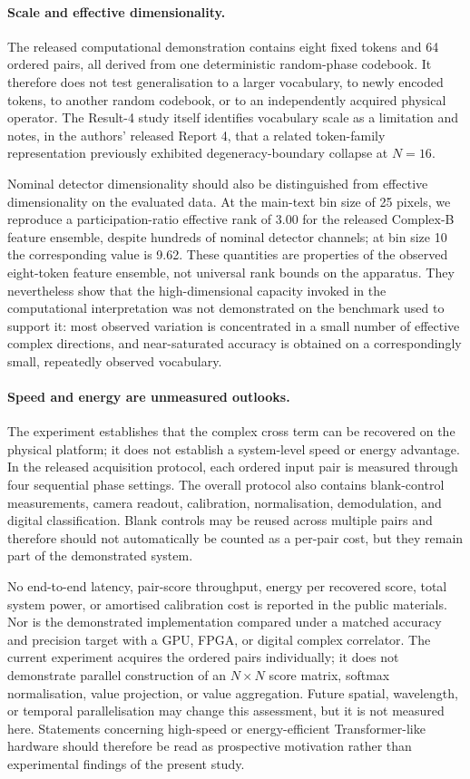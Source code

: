 \documentclass[11pt,a4paper]{article}
\begin{document}
\paragraph{Scale and effective dimensionality.}
The released computational demonstration contains eight fixed tokens and
64 ordered pairs, all derived from one deterministic random-phase codebook.
It therefore does not test generalisation to a larger vocabulary, to newly
encoded tokens, to another random codebook, or to an independently acquired
physical operator. The Result-4 study itself identifies vocabulary scale as a
limitation and notes, in the authors' released Report 4, that a related
token-family representation previously exhibited degeneracy-boundary collapse
at $N=16$.

Nominal detector dimensionality should also be distinguished from effective
dimensionality on the evaluated data. At the main-text bin size of 25 pixels,
we reproduce a participation-ratio effective rank of 3.00 for the released
Complex-B feature ensemble, despite hundreds of nominal detector channels;
at bin size 10 the corresponding value is 9.62. These quantities are
properties of the observed eight-token feature ensemble, not universal rank
bounds on the apparatus. They nevertheless show that the high-dimensional
capacity invoked in the computational interpretation was not demonstrated on
the benchmark used to support it: most observed variation is concentrated in
a small number of effective complex directions, and near-saturated accuracy
is obtained on a correspondingly small, repeatedly observed vocabulary.

\paragraph{Speed and energy are unmeasured outlooks.}
The experiment establishes that the complex cross term can be recovered on
the physical platform; it does not establish a system-level speed or energy
advantage. In the released acquisition protocol, each ordered input pair is
measured through four sequential phase settings. The overall protocol also
contains blank-control measurements, camera readout, calibration,
normalisation, demodulation, and digital classification. Blank controls may
be reused across multiple pairs and therefore should not automatically be
counted as a per-pair cost, but they remain part of the demonstrated system.

No end-to-end latency, pair-score throughput, energy per recovered score,
total system power, or amortised calibration cost is reported in the public
materials. Nor is the demonstrated implementation compared under a matched
accuracy and precision target with a GPU, FPGA, or digital complex
correlator. The current experiment acquires the ordered pairs individually;
it does not demonstrate parallel construction of an $N\times N$ score
matrix, softmax normalisation, value projection, or value aggregation.
Future spatial, wavelength, or temporal parallelisation may change this
assessment, but it is not measured here. Statements concerning high-speed or
energy-efficient Transformer-like hardware should therefore be read as
prospective motivation rather than experimental findings of the present
study.
\end{document}
